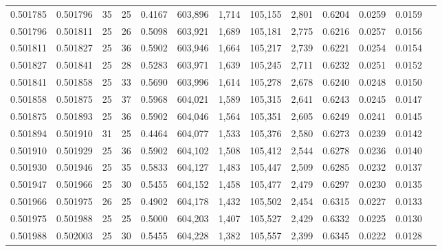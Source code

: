 \begin{tabular}{rrrrrrrrrrrrr}
0.501785 & 0.501796 &    35 &  25 &                                     0.4167 & 603,896 &   1,714 & 105,155 &   2,801 & 0.6204 & 0.0259 & 0.0159 \\
0.501796 & 0.501811 &    25 &  26 &                                     0.5098 & 603,921 &   1,689 & 105,181 &   2,775 & 0.6216 & 0.0257 & 0.0156 \\
0.501811 & 0.501827 &    25 &  36 &                                     0.5902 & 603,946 &   1,664 & 105,217 &   2,739 & 0.6221 & 0.0254 & 0.0154 \\
0.501827 & 0.501841 &    25 &  28 &                                     0.5283 & 603,971 &   1,639 & 105,245 &   2,711 & 0.6232 & 0.0251 & 0.0152 \\
0.501841 & 0.501858 &    25 &  33 &                                     0.5690 & 603,996 &   1,614 & 105,278 &   2,678 & 0.6240 & 0.0248 & 0.0150 \\
0.501858 & 0.501875 &    25 &  37 &                                     0.5968 & 604,021 &   1,589 & 105,315 &   2,641 & 0.6243 & 0.0245 & 0.0147 \\
0.501875 & 0.501893 &    25 &  36 &                                     0.5902 & 604,046 &   1,564 & 105,351 &   2,605 & 0.6249 & 0.0241 & 0.0145 \\
0.501894 & 0.501910 &    31 &  25 &                                     0.4464 & 604,077 &   1,533 & 105,376 &   2,580 & 0.6273 & 0.0239 & 0.0142 \\
0.501910 & 0.501929 &    25 &  36 &                                     0.5902 & 604,102 &   1,508 & 105,412 &   2,544 & 0.6278 & 0.0236 & 0.0140 \\
0.501930 & 0.501946 &    25 &  35 &                                     0.5833 & 604,127 &   1,483 & 105,447 &   2,509 & 0.6285 & 0.0232 & 0.0137 \\
0.501947 & 0.501966 &    25 &  30 &                                     0.5455 & 604,152 &   1,458 & 105,477 &   2,479 & 0.6297 & 0.0230 & 0.0135 \\
0.501966 & 0.501975 &    26 &  25 &                                     0.4902 & 604,178 &   1,432 & 105,502 &   2,454 & 0.6315 & 0.0227 & 0.0133 \\
0.501975 & 0.501988 &    25 &  25 &                                     0.5000 & 604,203 &   1,407 & 105,527 &   2,429 & 0.6332 & 0.0225 & 0.0130 \\
0.501988 & 0.502003 &    25 &  30 &                                     0.5455 & 604,228 &   1,382 & 105,557 &   2,399 & 0.6345 & 0.0222 & 0.0128 \\

\end{tabular}
